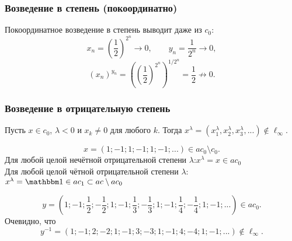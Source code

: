 \begin{frame}\frametitle{Возведение в степень (покоординатно)}
	Покоординатное возведение в степень выводит даже из $c_0$:
	\vfill
	\begin{equation}
		x_n = \left(\frac12\right)^{2^n} \to 0, \qquad
		y_n = \frac1{2^n} \to 0,
	\end{equation}
	\vfill
	\begin{equation}
		(x_n)^{y_n} = \left(\left(\frac12\right)^{2^n}\right)^{1/2^n}  = \frac12 \not \to 0
		.
	\end{equation}


\end{frame}



\begin{frame}\frametitle{Возведение в отрицательную степень}
	\begin{llemma}
		Пусть $x\in c_0$, $\lambda< 0$ и $x_k\ne 0 $ для любого $k$.
		Тогда
		$
			x^\lambda = (x_1^\lambda,x_2^\lambda,x_3^\lambda,...) \notin \ell_\infty
			.
		$
	\end{llemma}

	\begin{eexample}
		\begin{equation}
			x = (1;-1;1;-1;1;-1;...) \in ac_0 \setminus c_0
			.
		\end{equation}
		Для любой целой нечётной отрицательной степени $\lambda$:\quad $x^\lambda = x \in ac_0$
		\\
		Для любой целой чётной отрицательной степени $\lambda$:\quad\quad
		$
			x^\lambda  = \one \in ac_1 \subset ac \setminus ac_0
		$
	\end{eexample}

	\begin{eexample}
		\begin{equation}
			y = \left(1;-1;\frac12;-\frac12;1;-1;\frac13;-\frac13;1;-1;\frac14;-\frac14;1;-1;...\right) \in ac_0
			.
		\end{equation}
		Очевидно, что
		\begin{equation}
			y^{-1} = \left(1;-1;2;-2;1;-1;3;-3;1;-1;4;-4;1;-1;...\right)  \notin \ell_\infty
			.
		\end{equation}
	\end{eexample}

\end{frame}




